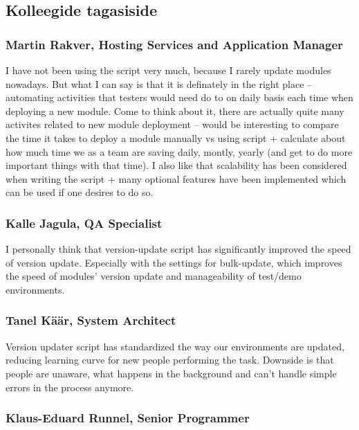 \documentclass[12pt]{report}
\begin{document}
  \subsection*{Kolleegide tagasiside}
  
  \subsubsection{Martin Rakver, Hosting Services and Application Manager}
  
  I have not been using the script very much, because I rarely update modules nowadays. But what I can say is that it is definately in the right place – automating activities that testers would need do to on daily basis each time when deploying a new module. Come to think about it, there are actually quite many activites related to new module deployment – would be interesting to compare the time it takes to deploy a module manually vs using script + calculate about how much time we as a team are saving daily, montly, yearly (and get to do more important things with that time).
I also like that scalability has been considered when writing the script + many optional features have been implemented which can be used if one desires to do so.

  \subsubsection{Kalle Jagula, QA Specialist}
  
  I personally think that version-update script has significantly improved the speed of version update. Especially with the settings for bulk-update, which improves the speed of modules' version update and manageability of test/demo environments.
  
  \subsubsection{Tanel Käär, System Architect}
  
  Version updater script has standardized the way our environments are updated, reducing learning curve for new people performing the task. Downside is that people are unaware, what happens in the background and can't handle simple errors in the process anymore.
  
  \subsubsection{Klaus-Eduard Runnel, Senior Programmer}
  
\end{document}
